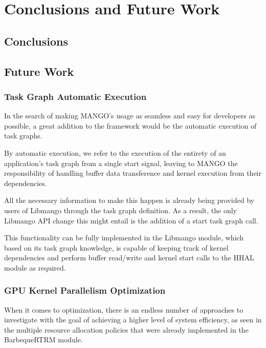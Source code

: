 \chapter{Conclusions and Future Work} \label{ch:Conclusions}


\section{Conclusions}

\section{Future Work}
\subsection{Task Graph Automatic Execution}

In the search of making MANGO's usage as seamless and easy for developers as possible, a great addition to the framework would be the automatic execution of task graphs. 

By automatic execution, we refer to the execution of the entirety of an application's task graph from a single start signal, leaving to MANGO the responsibility of handling buffer data transference and kernel execution from their dependencies.

All the necessary information to make this happen is already being provided by users of Libmango through the task graph definition. As a result, the only Libmango API change this might entail is the addition of a start task graph call.

This functionality can be fully implemented in the Libmango module, which based on its task graph knowledge, is capable of keeping track of kernel dependencies and perform buffer read/write and kernel start calls to the HHAL module as required.

\subsection{GPU Kernel Parallelism Optimization}

When it comes to optimization, there is an endless number of approaches to investigate with the goal of achieving a higher level of system efficiency, as seen in the multiple resource allocation policies that were already implemented in the BarbequeRTRM module.

